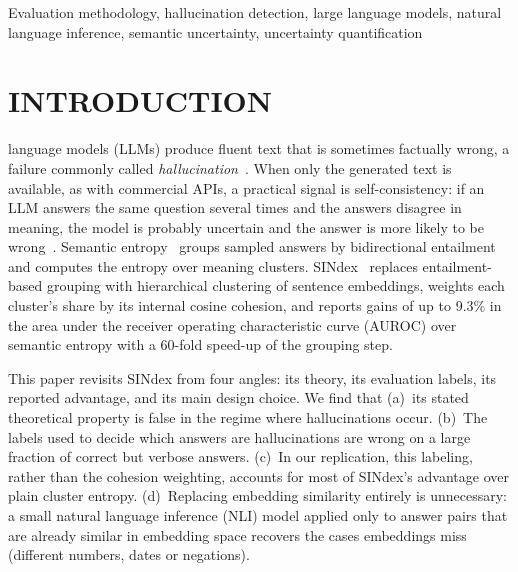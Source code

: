 \documentclass{ieeetj}
\begin{document}
\begin{IEEEkeywords}
Evaluation methodology, hallucination detection, large language models, natural language inference, semantic uncertainty, uncertainty quantification
\end{IEEEkeywords}

\maketitle

\section{INTRODUCTION}
 language models (LLMs) produce fluent text that is sometimes factually wrong, a failure commonly called \emph{hallucination}~\cite{ji2023survey,huang2025survey}. When only the generated text is available, as with commercial APIs, a practical signal is self-consistency: if an LLM answers the same question several times and the answers disagree in meaning, the model is probably uncertain and the answer is more likely to be wrong~\cite{manakul2023selfcheckgpt,kuhn2023semantic,farquhar2024detecting}. Semantic entropy~\cite{kuhn2023semantic,farquhar2024detecting} groups sampled answers by bidirectional entailment and computes the entropy over meaning clusters. SINdex~\cite{abdaljalil2026sindex} replaces entailment-based grouping with hierarchical clustering of sentence embeddings, weights each cluster's share by its internal cosine cohesion, and reports gains of up to 9.3\% in the area under the receiver operating characteristic curve (AUROC) over semantic entropy with a 60-fold speed-up of the grouping step.

This paper revisits SINdex from four angles: its theory, its evaluation labels, its reported advantage, and its main design choice. We find that (a)~its stated theoretical property is false in the regime where hallucinations occur. (b)~The labels used to decide which answers are hallucinations are wrong on a large fraction of correct but verbose answers. (c)~In our replication, this labeling, rather than the cohesion weighting, accounts for most of SINdex's advantage over plain cluster entropy. (d)~Replacing embedding similarity entirely is unnecessary: a small natural language inference (NLI) model applied only to answer pairs that are already similar in embedding space recovers the cases embeddings miss (different numbers, dates or negations).
\end{document}
